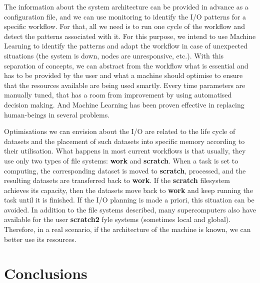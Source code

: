 \documentclass[a4paper]{article}
\begin{document}
The information about the system architecture can be provided in advance as a configuration file, and we can use monitoring to identify the I/O patterns for a specific workflow. For that, all we need is to run one cycle of the workflow and detect the patterns associated with it. For this purpose, we intend to use Machine Learning to identify the patterns and adapt the workflow in case of unexpected situations (the system is down, nodes are unresponsive, etc.).
With this separation of concepts, we can abstract from the workflow what is essential and has to be provided by the user and what a machine should optimise to ensure that the resources available are being used smartly. Every time parameters are manually tuned, that has a room from improvement by using automatised decision making. And Machine Learning has been proven effective in replacing human-beings in several problems.

Optimisations we can envision about the I/O are related to the life cycle of datasets and the placement of such datasets into specific memory according to their utilisation. What happens in most current workflows is that usually, they use only two types of file systems: \textbf{work} and \textbf{scratch}. When a task is set to computing, the corresponding dataset is moved to \textbf{scratch}, processed, and the resulting datasets are transferred back to \textbf{work}. If the \textbf{scratch} filesystem achieves its capacity, then the datasets move back to \textbf{work} and keep running the task until it is finished. If the I/O planning is made a priori, this situation can be avoided.
In addition to the file systems described, many supercomputers also have available for the user \textbf{scratch2} fyle systems (sometimes local and global). Therefore, in a real scenario, if the architecture of the machine is known, we can better use its resources.

\section{Conclusions}
\label{sec:conclusions}
\end{document}
